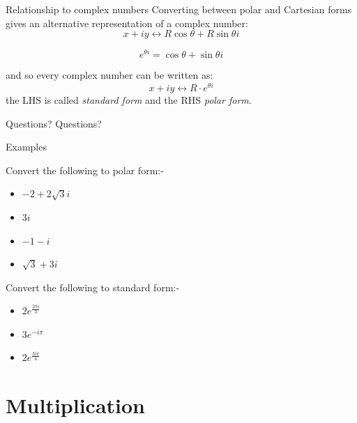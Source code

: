 \documentclass{beamer}
\begin{document}
\begin{frame}{Relationship to complex numbers}
Converting between polar and Cartesian forms gives an alternative representation of a complex number:
\begin{equation*}
x+iy \leftrightarrow R\cos\theta + R\sin\theta i
\end{equation*}
\begin{theorem}
\begin{equation*}
e^{\theta i} = \cos\theta + \sin\theta i
\end{equation*}
\end{theorem}
and so every complex number can be written as:
\begin{equation*}
x+iy \leftrightarrow R\cdot e^{\theta i}
\end{equation*}
the LHS is called \emph{standard form} and the RHS \emph{polar form}.
\end{frame}

\begin{frame}{Questions?}
Questions?
\end{frame}

\begin{frame}{Examples}
\begin{example}
Convert the following to polar form:-
\begin{itemize}
	\item $-2+2\sqrt{3}i$ %
	\item $3i$ %
	\item $-1-i$ %
	\item $\sqrt{3}+3i$ %
\end{itemize}
\end{example}
\begin{example}
Convert the following to standard form:-
\begin{itemize}
	\item $2e^{\frac{2\pi i}{3}}$ %
	\item $3e^{-i\pi}$ %
	\item $2e^{\frac{3i\pi}{4}}$ %
\end{itemize}
\end{example}
\end{frame}

\section{Multiplication}
\end{document}
